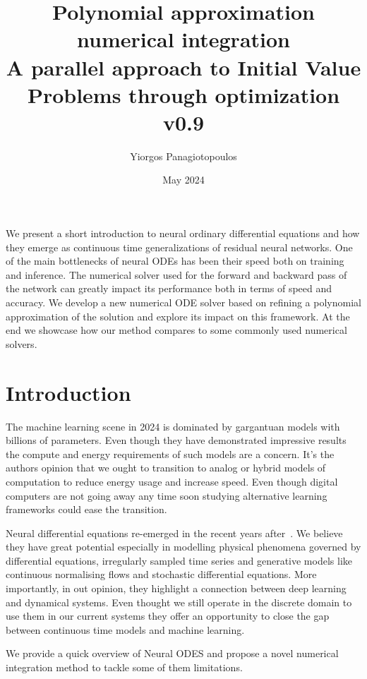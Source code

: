 \documentclass[11pt]{article}
\title{Polynomial approximation numerical integration\\ \large{A parallel approach to Initial Value Problems through optimization} \\ v0.9}
\author{Yiorgos Panagiotopoulos}
\date{May 2024}
\begin{document}
    \maketitle

    \abstract
    We present a short introduction to neural ordinary differential equations and how they emerge as continuous time
    generalizations of residual neural networks.
    One of the main bottlenecks of neural ODEs has been their speed both on training and inference.
    The numerical solver used for the forward and backward pass of the network can greatly impact its performance both
    in terms of speed and accuracy.
    We develop a new numerical ODE solver based on refining a polynomial approximation of the solution and explore its
    impact on this framework.
    At the end we showcase how our method compares to some commonly used numerical solvers.


    \section{Introduction}
    The machine learning scene in 2024 is dominated by gargantuan models with billions of parameters.
    Even though they have demonstrated impressive results the compute and energy requirements of such models are a
    concern.
    It's the authors opinion that we ought to transition to analog or hybrid models of computation to reduce energy
    usage and increase speed.
    Even though digital computers are not going away any time soon studying alternative learning frameworks could ease
    the transition.

    Neural differential equations re-emerged in the recent years after~\cite{chen2018neural}.
    We believe they have great potential especially in modelling physical phenomena governed by differential equations,
    irregularly sampled time series and generative models like continuous normalising flows and stochastic differential
    equations.
    More importantly, in out opinion, they highlight a connection between deep learning and dynamical systems.
    Even thought we still operate in the discrete domain to use them in our current systems they offer an opportunity
    to close the gap between continuous time models and machine learning.

    We provide a quick overview of Neural ODES and propose a novel numerical integration method to tackle some of
    them limitations.
\end{document}
